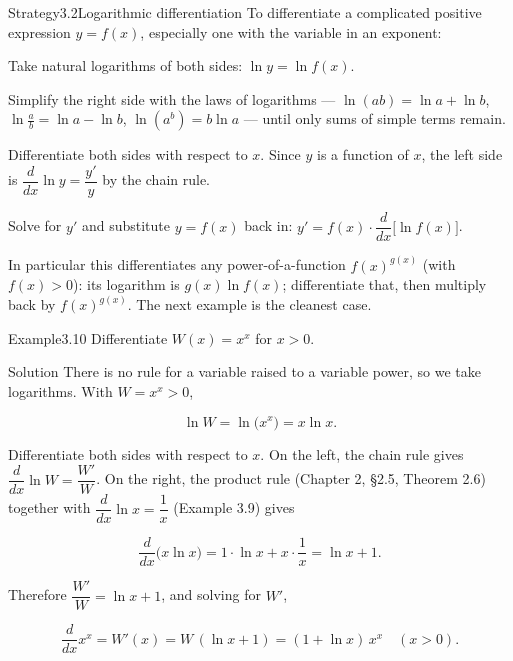 \documentclass[a4paper,12pt,oneside]{memoir}
\begin{document}
\begin{envstrategy}{Strategy}{3.2}{Logarithmic differentiation}
To differentiate a complicated positive expression \(y = f(x)\), especially one with the variable in an exponent:

\begin{steps}
  \item Take natural logarithms of both sides: \(\ln y = \ln f(x)\).
  \item Simplify the right side with the laws of logarithms — \(\ln(ab) = \ln a + \ln b\), \(\ln\frac{a}{b} = \ln a - \ln b\), \(\ln(a^{b}) = b\ln a\) — until only sums of simple terms remain.
  \item Differentiate both sides with respect to \(x\). Since \(y\) is a function of \(x\), the left side is \(\dfrac{d}{dx}\ln y = \dfrac{y'}{y}\) by the chain rule.
  \item Solve for \(y'\) and substitute \(y = f(x)\) back in: \(y' = f(x)\cdot\dfrac{d}{dx}\bigl[\ln f(x)\bigr]\).
\end{steps}
In particular this differentiates any power-of-a-function \(f(x)^{g(x)}\) (with \(f(x) > 0\)): its logarithm is \(g(x)\ln f(x)\); differentiate that, then multiply back by \(f(x)^{g(x)}\). The next example is the cleanest case.
\end{envstrategy}
\begin{workedexample}
\begin{envexample}{Example}{3.10}{}
Differentiate \(W(x) = x^{x}\) for \(x > 0\).
\end{envexample}
\begin{envsolution}{Solution}{}{}
There is no rule for a variable raised to a variable power, so we take logarithms. With \(W = x^{x} > 0\),

\[ \ln W = \ln\bigl(x^{x}\bigr) = x\ln x. \]

Differentiate both sides with respect to \(x\). On the left, the chain rule gives \(\dfrac{d}{dx}\ln W = \dfrac{W'}{W}\). On the right, the product rule (Chapter 2, §2.5, Theorem 2.6) together with \(\dfrac{d}{dx}\ln x = \dfrac{1}{x}\) (Example 3.9) gives

\[ \frac{d}{dx}\bigl(x\ln x\bigr) = 1\cdot\ln x + x\cdot\frac{1}{x} = \ln x + 1. \]

Therefore \(\dfrac{W'}{W} = \ln x + 1\), and solving for \(W'\),

\[ \frac{d}{dx}x^{x} = W'(x) = W\,(\ln x + 1) = (1 + \ln x)\,x^{x} \quad (x > 0). \]
\end{envsolution}
\end{workedexample}
\end{document}
